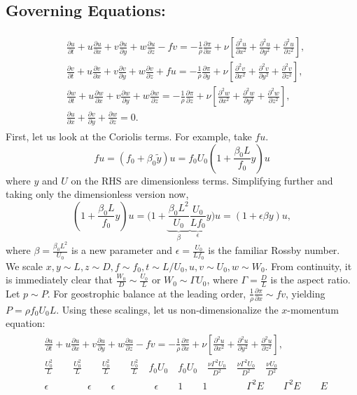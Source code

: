 \documentclass{article}
\newcommand{\pd}[2]{\frac{\partial{#1}}{\partial{#2}}}
\newcommand{\pdd}[2]{\frac{\partial^2{#1}}{\partial{#2}^2}}
\begin{document}
\subsection{Governing Equations:}
\begin{align}\label{eq:rotating-NS}
 \begin{split}
  & \pd{u}{t} + u \pd{u}{x} + v \pd{u}{y} + w\pd{u}{z} - fv = -\frac{1}{\rho} \pd{\pi}{x} + \nu\left[\pdd{u}{x} + \pdd{u}{y} + \pdd{u}{z}\right],\\
  & \pd{v}{t} + u \pd{v}{x} + v \pd{v}{y} + w\pd{v}{z} + fu = -\frac{1}{\rho} \pd{\pi}{y} + \nu\left[\pdd{v}{x} + \pdd{v}{y} + \pdd{v}{z}\right],\\
  & \pd{w}{t} + u \pd{w}{x} + v \pd{w}{y} + w\pd{w}{z}  = -\frac{1}{\rho} \pd{\pi}{z} + \nu\left[\pdd{w}{x} + \pdd{w}{y} + \pdd{w}{z}\right],\\
  & \pd{u}{x} + \pd{v}{y} + \pd{w}{z} = 0.
 \end{split}
\end{align}
 First, let us look at the Coriolis terms. For example, take $fu$. 
\begin{equation}
 f u = (f_{0}+\beta_{0}\tilde{y})u = f_{0}U_{0}\left(1 + \frac{\beta_{0} L}{f_{0}} y \right)u 
\end{equation}
where $y$ and $U$ on the RHS are dimensionless terms. Simplifying further and taking only the dimensionless version now, 
\begin{equation}
 \left(1 + \frac{\beta_{0} L}{f_{0}} y \right)u  = \bigg(1 + \underbrace{ \frac{\beta_{0} L^{2}}{U_{0}} }_{\beta} \underbrace{ \frac{U_{0}}{L f_{0}} }_{\epsilon} y \bigg)u = (1 + \epsilon \beta y) u, 
\end{equation}
where $\beta =  \frac{\beta_{0} L^{2}}{U_{0}} $ is a new parameter and $\epsilon =  \frac{U_{0}}{L f_{0}}$ is the familiar Rossby number.\\
%
We scale $x, y \sim L, z \sim D, f\sim f_{0}, t\sim L/U_{0}, u, v \sim U_{0}, w \sim W_{0}$. From continuity, it is immediately clear that $\frac{W_{0}}{D} \sim \frac{U_{0}}{L}$ or $W_{0} \sim \Gamma U_{0}$, where $\Gamma = \frac{D}{L}$ is the aspect ratio. \\
%
Let $p \sim P$. For geostrophic balance at the leading order, $\frac{1}{\rho} \frac{\partial \pi}{\partial x} \sim f v$, yielding $\boxed{P = \rho f_{0} U_{0} L}$.
%
Using these scalings, let us non-dimensionalize the $x$-momentum equation:
\begin{align}
 \begin{split}
  & \pd{u}{t} + u \pd{u}{x} + v \pd{u}{y} + w\pd{u}{z} - fv = -\frac{1}{\rho} \pd{\pi}{x} + \nu\left[\pdd{u}{x} + \pdd{u}{y} + \pdd{u}{z}\right],\\
  &\frac{U_{0}^{2}}{L} \quad \quad \frac{U_{0}^{2}}{L} \quad \quad  \frac{U_{0}^{2}}{L} \quad \quad \frac{U_{0}^{2}}{L} \quad f_{0}U_{0} \quad f_{0}U_{0} \quad \frac{\nu \Gamma^{2}U_{0}}{D^{2}} \quad \frac{\nu \Gamma^{2}U_{0}}{D^{2}} \quad \frac{\nu U_{0}}{D^{2}} \\
  & \epsilon \qquad \qquad \epsilon \qquad\epsilon \qquad \qquad \epsilon \qquad 1 \qquad 1 \qquad \qquad \Gamma^{2}E \qquad  \Gamma^{2}E \qquad  E 
 \end{split}
\end{align}
\end{document}
